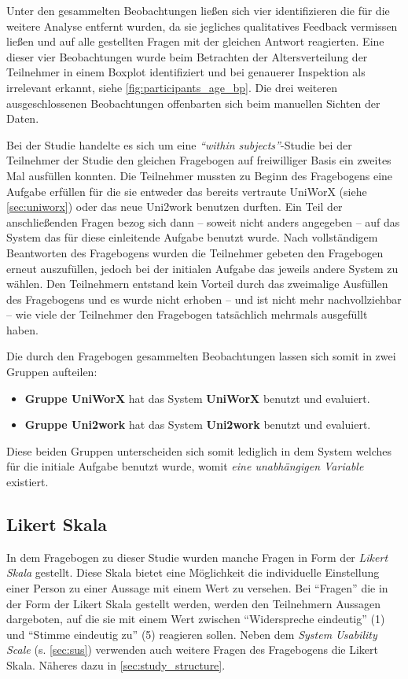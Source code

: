 \documentclass[11pt,a4paper,twoside,ngerman]{article}
\begin{document}
Unter den gesammelten Beobachtungen ließen sich vier identifizieren die für die weitere Analyse entfernt wurden, da sie jegliches qualitatives Feedback vermissen ließen und auf alle gestellten Fragen mit der gleichen Antwort reagierten. Eine dieser vier Beobachtungen wurde beim Betrachten der Altersverteilung der Teilnehmer in einem Boxplot identifiziert und bei genauerer Inspektion als irrelevant erkannt, siehe \autoref{fig:participants_age_bp}. Die drei weiteren ausgeschlossenen Beobachtungen offenbarten sich beim manuellen Sichten der Daten.

Bei der Studie handelte es sich um eine \emph{"`within subjects"'}-Studie bei der Teilnehmer der Studie den gleichen Fragebogen auf freiwilliger Basis ein zweites Mal ausfüllen konnten. Die Teilnehmer mussten zu Beginn des Fragebogens eine Aufgabe erfüllen für die sie entweder das bereits vertraute UniWorX (siehe \autoref{sec:uniworx}) oder das neue Uni2work benutzen durften. Ein Teil der anschließenden Fragen bezog sich dann -- soweit nicht anders angegeben -- auf das System das für diese einleitende Aufgabe benutzt wurde. Nach vollständigem Beantworten des Fragebogens wurden die Teilnehmer gebeten den Fragebogen erneut auszufüllen, jedoch bei der initialen Aufgabe das jeweils andere System zu wählen. Den Teilnehmern entstand kein Vorteil durch das zweimalige Ausfüllen des Fragebogens und es wurde nicht erhoben -- und ist nicht mehr nachvollziehbar -- wie viele der Teilnehmer den Fragebogen tatsächlich mehrmals ausgefüllt haben.

Die durch den Fragebogen gesammelten Beobachtungen lassen sich somit in zwei Gruppen aufteilen:

\begin{itemize}
    \item \textbf{Gruppe UniWorX} hat das System \textbf{UniWorX} benutzt und evaluiert.
    \item \textbf{Gruppe Uni2work} hat das System \textbf{Uni2work} benutzt und evaluiert.
\end{itemize}

Diese beiden Gruppen unterscheiden sich somit lediglich in dem System welches für die initiale Aufgabe benutzt wurde, womit \emph{eine unabhängigen Variable} existiert.

\subsection{Likert Skala} \label{sec:likert}
In dem Fragebogen zu dieser Studie wurden manche Fragen in Form der \emph{Likert Skala} gestellt.
Diese Skala bietet eine Möglichkeit die individuelle Einstellung einer Person zu einer Aussage mit einem Wert zu versehen. Bei "`Fragen"' die in der Form der Likert Skala gestellt werden, werden den Teilnehmern Aussagen dargeboten, auf die sie mit einem Wert zwischen "`Widerspreche eindeutig"' (1) und "`Stimme eindeutig zu"' (5) reagieren sollen. Neben dem \emph{System Usability Scale} (s. \autoref{sec:sus}) verwenden auch weitere Fragen des Fragebogens die Likert Skala. Näheres dazu in \autoref{sec:study_structure}.
\end{document}

